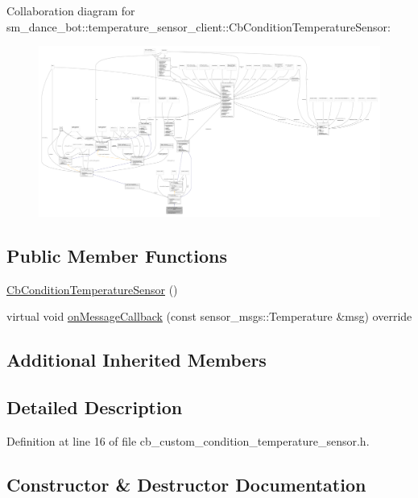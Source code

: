 Collaboration diagram for sm\+\_\+dance\+\_\+bot\+:\+:temperature\+\_\+sensor\+\_\+client\+:\+:Cb\+Condition\+Temperature\+Sensor\+:
\nopagebreak
\begin{figure}[H]
\begin{center}
\leavevmode
\includegraphics[width=350pt]{classsm__dance__bot_1_1temperature__sensor__client_1_1CbConditionTemperatureSensor__coll__graph}
\end{center}
\end{figure}
\subsection*{Public Member Functions}
\begin{DoxyCompactItemize}
\item 
\hyperlink{classsm__dance__bot_1_1temperature__sensor__client_1_1CbConditionTemperatureSensor_a740ff342ec7134dbb0775ab34f70622a}{Cb\+Condition\+Temperature\+Sensor} ()
\item 
virtual void \hyperlink{classsm__dance__bot_1_1temperature__sensor__client_1_1CbConditionTemperatureSensor_adad387793eb12e7bb97c83cc515ab4b6}{on\+Message\+Callback} (const sensor\+\_\+msgs\+::\+Temperature \&msg) override
\end{DoxyCompactItemize}
\subsection*{Additional Inherited Members}


\subsection{Detailed Description}


Definition at line 16 of file cb\+\_\+custom\+\_\+condition\+\_\+temperature\+\_\+sensor.\+h.



\subsection{Constructor \& Destructor Documentation}
